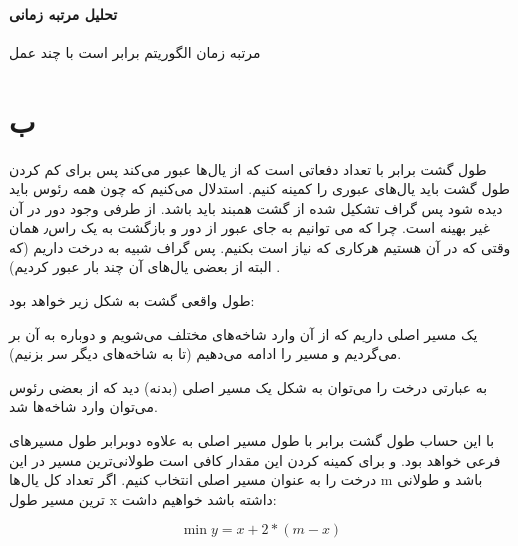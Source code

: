 \paragraph{تحلیل مرتبه زمانی}
مرتبه زمان الگوریتم برابر است با چند عمل

\section*{ب}

طول گشت برابر با تعداد دفعاتی است که از یال‌ها عبور می‌کند پس برای کم کردن طول گشت باید یال‌های عبوری را کمینه کنیم. استدلال می‌کنیم که چون همه رئوس باید دیده شود پس گراف تشکیل شده از گشت همبند باید باشد. از طرفی وجود دور در آن غیر بهینه است. چرا که می توانیم به جای عبور از دور و بازگشت به یک راس٫ همان وقتی که در آن هستیم هرکاری که نیاز است بکنیم. پس گراف شبیه به درخت داریم (که البته از بعضی یال‌های آن‌ چند بار عبور کردیم)
.

طول واقعی گشت به شکل زیر خواهد بود:

یک مسیر اصلی داریم که از آن وارد شاخه‌های مختلف می‌شویم و دوباره به آن بر می‌گردیم و مسیر را ادامه می‌دهیم (تا به شاخه‌های دیگر سر بزنیم).

به عبارتی درخت را می‌توان به شکل یک مسیر اصلی (بدنه‌) دید که از بعضی رئوس می‌توان وارد شاخه‌ها شد. 

با این حساب طول گشت برابر با طول مسیر اصلی به علاوه دوبرابر طول مسیرهای فرعی خواهد بود.  و برای کمینه کردن این مقدار کافی است طولانی‌ترین مسیر در این درخت را به عنوان مسیر اصلی انتخاب کنیم. 
اگر تعداد کل یال‌ها m باشد و طولانی ترین مسیر طول x
داشته باشد خواهیم داشت:

\begin{equation*}
	\min y = x + 2*(m-x)
\end{equation*}

